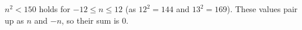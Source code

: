 $n^2<150$ holds for $-12\le n\le12$ (as $12^2=144$ and $13^2=169$). These values pair up as $n$ and $-n$, so their sum is $\boxed{0}$.
